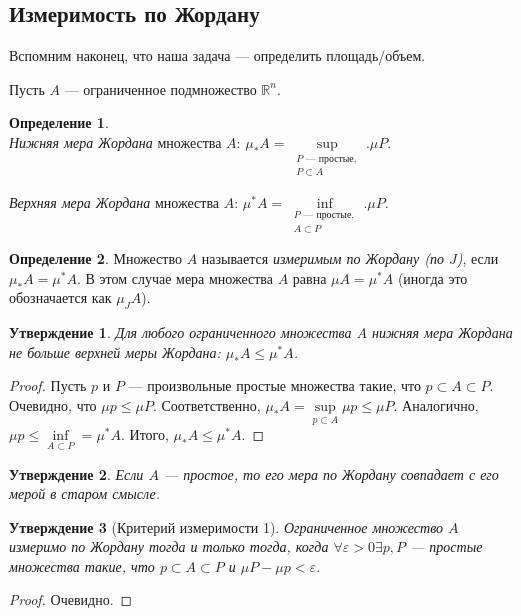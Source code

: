 \documentclass[a4paper,12pt]{article}
\theoremstyle{remark}
\theoremstyle{definition}
\newtheorem{Def}{Определение}
\theoremstyle{plain}
\newtheorem*{Statement}{Утверждение}
\newcommand{\0}{\vec{0}}
\newcommand{\eps}{\varepsilon}
\newcommand{\R}{\mathbb{R}}
\renewcommand{\leq}{\leqslant}
\begin{document}
\subsection{Измеримость по Жордану}

Вспомним наконец, что наша задача --- определить площадь/объем.

Пусть $A$ --- ограниченное подмножество $\R^n$.

\begin{Def}\ \\
\textit{Нижняя мера Жордана} множества $A$: $\mu_*A = \sup\limits_{\substack{P \text{ --- простые},\\ P \subset A}}. \mu P$.

\textit{Верхняя мера Жордана} множества $A$: $\mu^*A = \inf\limits_{\substack{P \text{ --- простые},\\ A \subset P}}. \mu P$.
\end{Def}

\begin{Def}
Множество $A$ называется \textit{измеримым по Жордану (по $J$)}, если $\mu_*A = \mu^*A$. В этом случае мера множества $A$ равна $\mu A = \mu^*A$ (иногда это обозначается как $\mu_J A$).
\end{Def}

\begin{Statement}
Для любого ограниченного множества $A$ нижняя мера Жордана не больше верхней меры Жордана: $\mu_*A \leq \mu^*A$.
\end{Statement}
\begin{proof}
Пусть $p$ и $P$ --- произвольные простые множества такие, что $p \subset A \subset P$. Очевидно, что $\mu p \leq \mu P$. Соответственно, $\mu_* A = \sup\limits_{p \subset A} \mu p \leq \mu P$. Аналогично, $\mu p \leq \inf\limits_{A \subset P} = \mu^* A$. Итого, $\mu_* A \leq \mu^* A$.
\end{proof}

\begin{Statement}
Если $A$ --- простое, то его мера по Жордану совпадает с его мерой в старом смысле.
\end{Statement}

\begin{Statement}[Критерий измеримости 1]
Ограниченное множество $A$ измеримо по Жордану тогда и только тогда, когда $\forall \eps > 0 \exists p, P$ --- простые множества такие, что $p \subset A \subset P$ и $\mu P - \mu p < \eps$.
\end{Statement}
\begin{proof}
Очевидно.
\end{proof}
\end{document}
